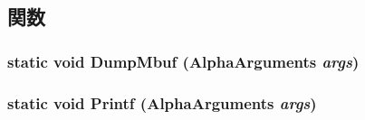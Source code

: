 \subsection{関数}
\hypertarget{classTru64AlphaSystem_a8728dd911bd0f85267192970b5141f67}{
\subsubsection[{DumpMbuf}]{\setlength{\rightskip}{0pt plus 5cm}static void DumpMbuf (AlphaArguments {\em args})}}
\label{classTru64AlphaSystem_a8728dd911bd0f85267192970b5141f67}
\hypertarget{classTru64AlphaSystem_a7aab4d733bbaec993b9eab18250f028d}{
\subsubsection[{Printf}]{\setlength{\rightskip}{0pt plus 5cm}static void Printf (AlphaArguments {\em args})}}
\label{classTru64AlphaSystem_a7aab4d733bbaec993b9eab18250f028d}


